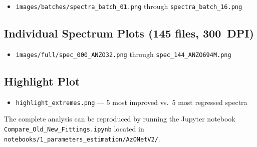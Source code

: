 \documentclass[12pt,a4paper]{article}
\begin{document}
\begin{itemize}[noitemsep]
    \item \texttt{images/batches/spectra\_batch\_01.png} through \texttt{spectra\_batch\_16.png}
\end{itemize}

\subsection*{Individual Spectrum Plots (145 files, 300~DPI)}

\begin{itemize}[noitemsep]
    \item \texttt{images/full/spec\_000\_ANZO32.png} through \texttt{spec\_144\_ANZO694M.png}
\end{itemize}

\subsection*{Highlight Plot}

\begin{itemize}[noitemsep]
    \item \texttt{highlight\_extremes.png} --- 5 most improved vs.\ 5 most regressed spectra
\end{itemize}

\vspace{1em}
\noindent The complete analysis can be reproduced by running the Jupyter notebook\\
\texttt{Compare\_Old\_New\_Fittings.ipynb} located in \texttt{notebooks/1\_parameters\_estimation/AzONetV2/}.
\end{document}
